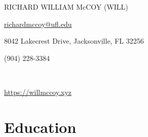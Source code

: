 \documentclass{article}
\newcommand\midtextbox[1]{%
  \parbox{.6\textwidth}{#1}%
}
\newcommand\outtextbox[1]{%
  \parbox{.2\textwidth}{#1}%
}
\newenvironment{TitleCenter}[1][\topsep]
  {\setlength{\topsep}{#1}\par\kern\topsep\centering}%
  {\par\kern\topsep}%
\begin{document}
\thispagestyle{empty}

\begin{TitleCenter}[0em]
\bfseries\huge

RICHARD WILLIAM McCOY (WILL)
\end{TitleCenter}
\noindent\outtextbox{\href{richardmccoy@ufl.edu}{richardmccoy@ufl.edu}\hfill}\midtextbox{\hfil8042 Lakecrest Drive, Jacksonville, FL 32256\hfil}\outtextbox{\hfill (904) 228-3384} \\
\noindent\outtextbox{\href{https://willmccoy.xyz}{https://willmccoy.xyz}\hfill}\midtextbox{\hfil\hfil}\outtextbox{\hfill}


\vspace{-1em}
\section{Education}
\end{document}
